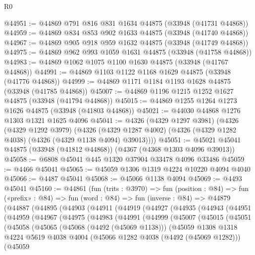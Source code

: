 \begin{lexlean}{R0}
\begin{coremodule}
@44951 := @44869 @791 @816 @831 @1634 @44875 (@33948 (@41731 @44868))
@44959 := @44869 @834 @853 @902 @1633 @44875 (@33948 (@41740 @44868))
@44967 := @44869 @905 @918 @959 @1632 @44875 (@33948 (@41749 @44868))
@44975 := @44869 @962 @993 @1059 @1631 @44875 (@33948 (@41758 @44868))
@44983 := @44869 @1062 @1075 @1100 @1630 @44875 (@33948 (@41767 @44868))
@44991 := @44869 @1103 @1122 @1168 @1629 @44875 (@33948 (@41776 @44868))
@44999 := @44869 @1171 @1184 @1193 @1628 @44875 (@33948 (@41785 @44868))
@45007 := @44869 @1196 @1215 @1252 @1627 @44875 (@33948 (@41794 @44868))
@45015 := @44869 @1255 @1264 @1273 @1626 @44875 (@33948 (@41803 @44868))
@45021 := @44030 @44868 @1276 @1303 @1321 @1625 @4096
@45041 := @4326
    (@4329 @1297 @3981)
    (@4326
      (@4329 @1292 @3979)
      (@4326 (@4329 @1287 @4002) (@4326 (@4329 @1282 @4038) (@4326 (@4329 @1138 @4094) @39013))))
@45051 := @45021 @45041 @44875 (@33948 (@41812 @44868)) (@4367 (@4368 @1303 @4096 @39013))
@45058 := @6808 @45041 @445 @1320 @37904 @33478 @4096 @33486
@45059 := @4466 @45041
@45065 := @45059 @1306 @1319 @4224 @10220 @4094 @4040
@45066 := @4487 @45041
@45068 := @45066 @1138 @4094
@45069 := @4493 @45041
@45160 := @44861
    (fun (trits : @3970) =>
    fun (position : @84) =>
    fun («prefix» : @84) =>
    fun (word : @84) =>
    fun (inverse : @84) =>
    @44879
      (@44887
        (@44895
          (@44903
            (@44911
              (@44919
                (@44927
                  (@44935
                    (@44943
                      (@44951
                        (@44959
                          (@44967
                            (@44975
                              (@44983
                                (@44991
                                  (@44999
                                    (@45007
                                      (@45015
                                        (@45051
                                          (@45058
                                            (@45065
                                              (@45068 (@4492 (@45069 @1138)))
                                              (@45059
                                                @1308
                                                @1318
                                                @4224
                                                @5619
                                                @4038
                                                @4004
                                                (@45066 @1282 @4038 (@4492 (@45069 @1282)))
                                                (@45059

\end{coremodule}
\end{lexlean}
